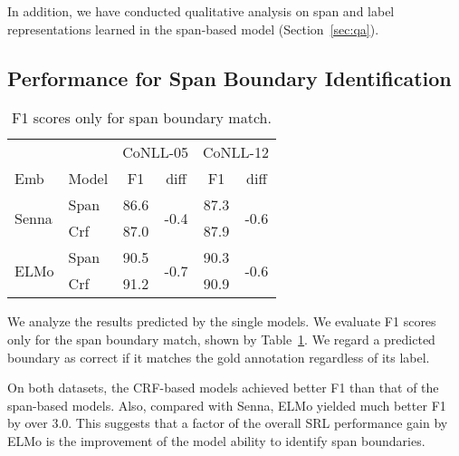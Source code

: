 \documentclass[11pt,a4paper]{article}
\begin{document}
\noindent
In addition, we have conducted qualitative analysis on span and label representations learned in the span-based model (Section~\ref{sec:qa}).

\subsection{Performance for Span Boundary Identification}
\label{sec:sbi}
\begin{table}[t]
  \centering
  {\small
  \begin{tabular}{llcccc} \toprule
                  & & \multicolumn{2}{c}{CoNLL-05} & \multicolumn{2}{c}{CoNLL-12} \\
                  {\sc Emb}& {\sc Model} & F1 & diff & F1 & diff \\ \hline
\multirow{2}{*}{\sc Senna} & {\sc Span}    & 86.6 & \multirow{2}{*}{-0.4}& 87.3 & \multirow{2}{*}{-0.6} \\
 & {\sc Crf}       & 87.0 &  & 87.9 & \\ \hline
\multirow{2}{*}{\sc ELMo} & {\sc Span}     & 90.5 & \multirow{2}{*}{-0.7} & 90.3 &\multirow{2}{*}{-0.6}  \\
 & {\sc Crf}        & 91.2 &   & 90.9 &  \\ \toprule
  \end{tabular}
  }
  \caption{\label{tab:span-identification} F1 scores only for span boundary match.}
\end{table}

We analyze the results predicted  by the single models.
We evaluate F1 scores only for the span boundary match, shown by Table~\ref{tab:span-identification}.
We regard a predicted boundary  as correct if it matches the gold annotation regardless of its label.

On both datasets, the CRF-based models achieved better F1 than that of the span-based models.
Also, compared with {\sc Senna}, {\sc ELMo} yielded much better F1 by over 3.0.
This suggests that a factor of the overall SRL performance gain by {\sc ELMo} is the improvement of the model ability to identify span boundaries.
\end{document}
